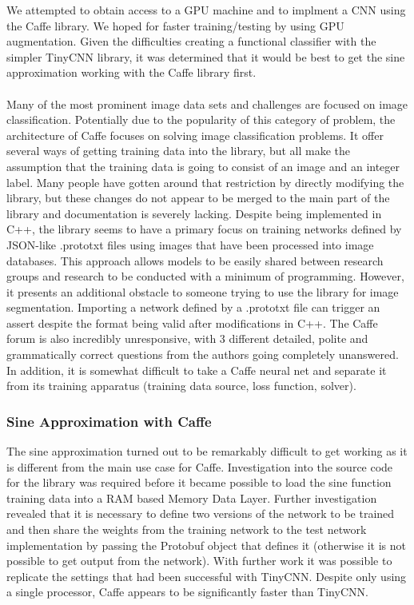 \documentclass[12pt]{article}
\begin{document}
	We attempted to obtain access to a GPU machine and to implment a CNN using the Caffe library. We hoped for faster training/testing by using GPU augmentation. Given the difficulties creating a functional classifier with the simpler TinyCNN library, it was determined that it would be best to get the sine approximation working with the Caffe library first.\\
\\
	Many of the most prominent image data sets and challenges are focused on image classification. Potentially due to the popularity of this category of problem, the architecture of Caffe focuses on solving image classification problems.  It offer several ways of getting training data into the library, but all make the assumption that the training data is going to consist of an image and an integer label.  Many people have gotten around that restriction by directly modifying the library, but these changes do not appear to be merged to the main part of the library and documentation is severely lacking.  Despite being implemented in C++, the library seems to have a primary focus on training networks defined by JSON-like .prototxt files using images that have been processed into image databases.  This approach allows models to be easily shared between research groups and research to be conducted with a minimum of programming. However, it presents an additional obstacle to someone trying to use the library for image segmentation. Importing a network defined by a .prototxt file can trigger an assert despite the format being valid after modifications in C++.  The Caffe forum is also incredibly unresponsive, with 3 different detailed, polite and grammatically correct questions from the authors going completely unanswered.  In addition, it is somewhat difficult to take a Caffe neural net and separate it from its training apparatus (training data source, loss function, solver).

\subsubsection{Sine Approximation with Caffe}
	The sine approximation turned out to be remarkably difficult to get working as it is different from the main use case for Caffe.  Investigation into the source code for the library was required before it became possible to load the sine function training data into a RAM based Memory Data Layer.  Further investigation revealed that it is necessary to define two versions of the network to be trained and then share the weights from the training network to the test network implementation by passing the Protobuf object that defines it (otherwise it is not possible to get output from the network).  With further work it was possible to replicate the settings that had been successful with TinyCNN.  Despite only using a single processor, Caffe appears to be significantly faster than TinyCNN.
\end{document}
